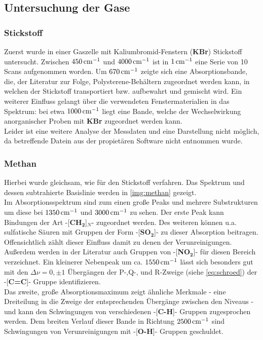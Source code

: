 \documentclass[a4paper,10pt,twocolumn]{article}
\newcommand{\fett}[1]{\textbf{#1}}
\begin{document}
		\subsection{Untersuchung der Gase}

		\subsubsection*{Stickstoff}
		Zuerst wurde in einer Gaszelle mit Kaliumbromid-Fenstern (\fett{KBr}) Stickstoff untersucht. Zwischen $\unit[450]{cm^{-1}}$ und $\unit[4000]{cm^{-1}}$ ist in $\unit[1]{cm^{-1}}$ eine Serie von 10 Scans aufgenommen worden. Um $\unit[670]{cm^{-1}}$ zeigte sich eine Absorptionsbande, die, der Literatur zur Folge, Polysterene-Beh\"altern zugeordnet werden kann, in welchen der Stickstoff transportiert bzw. aufbewahrt und gemischt wird. Ein weiterer Einfluss gelangt \"uber die verwendeten Fenstermaterialien in das Spektrum: bei etwa $\unit[1000]{cm^{-1}}$  liegt eine Bande, welche der Wechselwirkung anorganischer Proben mit \fett{KBr} zugeordnet werden kann.\\
		Leider ist eine weitere Analyse der Messdaten und eine Darstellung nicht m\"oglich, da betreffende Datein aus der propiet\"aren Software nicht entnommen wurde.
		
		\subsubsection*{Methan}
		Hierbei wurde gleichsam, wie f\"ur den Stickstoff verfahren. Das Spektrum und dessen subtrahierte Basislinie werden in \autoref{img:methan} gezeigt.\\
		Im Absorptionsspektrum sind zum einen gro{\ss}e Peaks und mehrere Substrukturen um diese bei $\unit[1350]{cm^{-1}}$ und $\unit[3000]{cm^{-1}}$ zu sehen. Der erste Peak kann Bindungen der Art -[\fett{CH}$_{\fett{2}}$]$_{N}$- zugeordnet werden. Des weiteren k\"onnen  u.a. sulfatische S\"auren mit Gruppen der Form -[\fett{SO}$_{\fett{2}}$]- zu dieser Absorption beitragen. Offensichtlich z\"ahlt dieser Einfluss damit zu denen der Verunreinigungen. Au{\ss}erdem werden in der Literatur auch Gruppen von -[\fett{NO}$_{\fett{2}}$]- f\"ur diesen Bereich verzeichnet. Ein kleinerer Nebenpeak um ca. $\unit[1550]{cm^{-1}}$ l\"asst sich besonders gut mit den $\Delta\nu=0,\pm1$ \"Uberg\"angen der P-,Q-, und R-Zweige (siehe \autoref{eq:schroed}) der -[\fett{C=C}]- Gruppe identifizieren.\\
		Das zweite, gro{\ss}e Absorptionsmaximum zeigt \"ahnliche Merkmale - eine Dreiteilung in die Zweige der entsprechenden \"Uberg\"ange zwischen den Niveaus - und kann den Schwingungen von verschiedenen -[\fett{C-H}]- Gruppen zugesprochen werden. Dem breiten Verlauf dieser Bande in Richtung $\unit[2500]{cm^{-1}}$ sind Schwingungen von Verunreinigungen mit -[\fett{O-H}]- Gruppen geschuldet.
\end{document}
